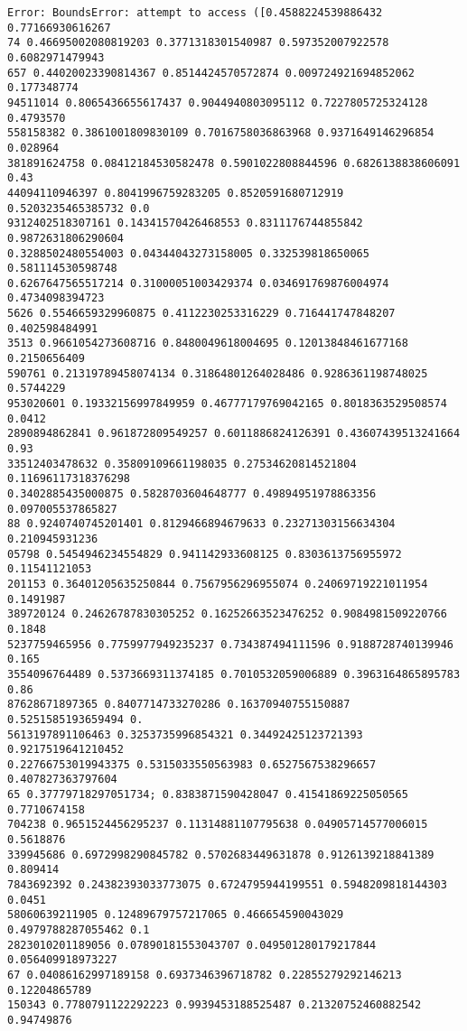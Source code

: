 \documentclass[12pt,a4paper]{article}
\begin{document}
\begin{lstlisting}
Error: BoundsError: attempt to access ([0.4588224539886432 0.77166930616267
74 0.46695002080819203 0.3771318301540987 0.597352007922578 0.6082971479943
657 0.44020023390814367 0.8514424570572874 0.009724921694852062 0.177348774
94511014 0.8065436655617437 0.9044940803095112 0.7227805725324128 0.4793570
558158382 0.3861001809830109 0.7016758036863968 0.9371649146296854 0.028964
381891624758 0.08412184530582478 0.5901022808844596 0.6826138838606091 0.43
44094110946397 0.8041996759283205 0.8520591680712919 0.5203235465385732 0.0
9312402518307161 0.14341570426468553 0.8311176744855842 0.9872631806290604 
0.3288502480554003 0.04344043273158005 0.332539818650065 0.581114530598748 
0.6267647565517214 0.31000051003429374 0.034691769876004974 0.4734098394723
5626 0.5546659329960875 0.4112230253316229 0.716441747848207 0.402598484991
3513 0.9661054273608716 0.8480049618004695 0.12013848461677168 0.2150656409
590761 0.21319789458074134 0.31864801264028486 0.9286361198748025 0.5744229
953020601 0.19332156997849959 0.46777179769042165 0.8018363529508574 0.0412
2890894862841 0.961872809549257 0.6011886824126391 0.43607439513241664 0.93
33512403478632 0.35809109661198035 0.27534620814521804 0.11696117318376298 
0.3402885435000875 0.5828703604648777 0.49894951978863356 0.097005537865827
88 0.9240740745201401 0.8129466894679633 0.23271303156634304 0.210945931236
05798 0.5454946234554829 0.941142933608125 0.8303613756955972 0.11541121053
201153 0.36401205635250844 0.7567956296955074 0.24069719221011954 0.1491987
389720124 0.24626787830305252 0.16252663523476252 0.9084981509220766 0.1848
5237759465956 0.7759977949235237 0.734387494111596 0.9188728740139946 0.165
3554096764489 0.5373669311374185 0.7010532059006889 0.3963164865895783 0.86
87628671897365 0.8407714733270286 0.16370940755150887 0.5251585193659494 0.
5613197891106463 0.3253735996854321 0.34492425123721393 0.9217519641210452 
0.22766753019943375 0.5315033550563983 0.6527567538296657 0.407827363797604
65 0.37779718297051734; 0.8383871590428047 0.41541869225050565 0.7710674158
704238 0.9651524456295237 0.11314881107795638 0.04905714577006015 0.5618876
339945686 0.6972998290845782 0.5702683449631878 0.9126139218841389 0.809414
7843692392 0.24382393033773075 0.6724795944199551 0.5948209818144303 0.0451
58060639211905 0.12489679757217065 0.466654590043029 0.4979788287055462 0.1
2823010201189056 0.07890181553043707 0.049501280179217844 0.056409918973227
67 0.04086162997189158 0.6937346396718782 0.22855279292146213 0.12204865789
150343 0.7780791122292223 0.9939453188525487 0.21320752460882542 0.94749876

\end{lstlisting}
\end{document}
